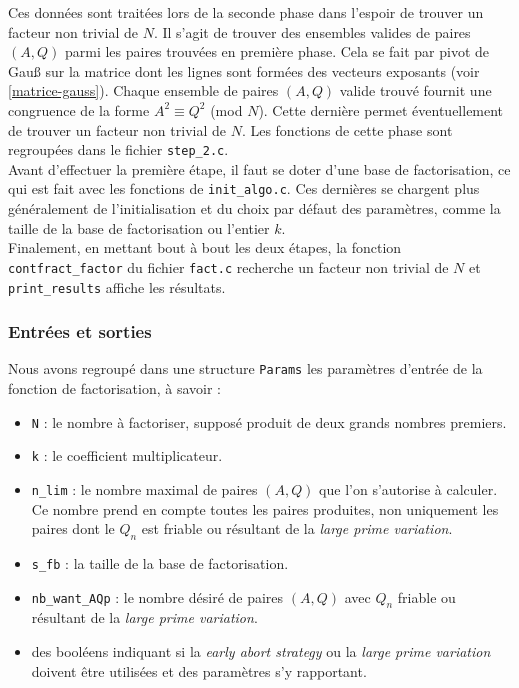 Ces données sont traitées lors de la seconde phase dans l'espoir de trouver un
facteur non trivial de $N$. Il s'agit de trouver des ensembles valides de
paires $(A, Q)$ parmi les paires trouvées en première phase. Cela se fait par
pivot de Gau\ss{} sur la matrice dont les lignes sont formées des vecteurs
exposants (voir \ref{matrice-gauss}). Chaque ensemble de paires $(A, Q)$ valide
trouvé fournit une congruence de la forme $A^2 \equiv Q^2$ (mod $N$). Cette
dernière permet éventuellement de trouver un facteur non trivial de $N$. Les
fonctions de cette phase sont regroupées dans le fichier \texttt{step\_2.c}. \\

Avant d'effectuer la première étape, il faut se doter d'une base de factorisation,
ce qui est fait avec les fonctions de \texttt{init\_algo.c}. Ces dernières se
chargent plus généralement de l'initialisation et du choix par défaut des
paramètres, comme la taille de la base de factorisation ou l'entier $k$. \\

Finalement, en mettant bout à bout les deux étapes, la fonction 
\texttt{contfract\_factor} du fichier \texttt{fact.c} recherche un facteur
non trivial de $N$ et \texttt{print\_results} affiche les résultats. 

\subsubsection{Entrées et sorties}

Nous avons regroupé dans une structure \texttt{Params} les paramètres d'entrée
de la fonction de factorisation, à savoir :

\begin{itemize}
	\item \texttt{N} : le nombre à factoriser, supposé produit de deux grands
	nombres premiers.
    \item \texttt{k} : le coefficient multiplicateur.
	\item \texttt{n\_lim} : le nombre maximal de paires $(A,Q)$ que l'on
	s'autorise à calculer. Ce nombre prend en compte toutes les paires
	produites, non uniquement les paires dont le $Q_n$ est friable ou résultant
	de la \textit{large prime variation}.
    \item \texttt{s\_fb} : la taille de la base de factorisation. 
	\item \texttt{nb\_want\_AQp} : le nombre désiré de paires $(A,Q)$ avec
	$Q_n$ friable ou résultant de la \textit{large prime variation}.
	\item des booléens indiquant si la \textit{early abort strategy} ou la
	\textit{large prime variation} doivent être utilisées et des paramètres s'y
	rapportant.
\end{itemize}


